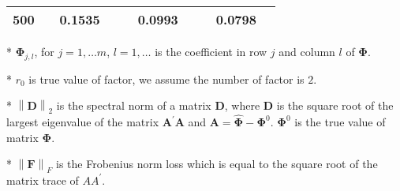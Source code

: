 \documentclass[12pt,a4paper,hyperref]{article}
\begin{document}
\begin{table}[H]
\begin{threeparttable}
\begin{tabular} {*{10}{c}}
500& &0.1535& &  & 0.0993& & &0.0798 & \\
\bottomrule
\end{tabular}
\begin{tablenotes}
\footnotesize
  \item[*] $\boldsymbol{\Phi}_{j,l}$, for $j=1,\ldots m$, $l=1,\ldots$ is the coefficient in row $j$ and column $l$ of $\boldsymbol{\Phi}$.
\item[*] $r_{0}$ is true value of factor, we assume the number of factor is $2$.
 \item[*] $\left\| \boldsymbol{D} \right\|_{2}$ is the spectral norm of a matrix $\boldsymbol{D}$, where $\boldsymbol{D}$ is the square root of the largest eigenvalue of the matrix $\boldsymbol{A}^{'}\boldsymbol{A}$ and $\boldsymbol{A}=\hat{\boldsymbol{\Phi}}- \boldsymbol{\Phi}^{0}$. $\boldsymbol{\Phi}^{0}$ is the true value of matrix $\boldsymbol{\Phi}$.
 \item[*] $\left\| \boldsymbol{F} \right\|_{F} $ is the Frobenius norm loss which is equal to the square root of the matrix trace of $AA^{'}$.
    \end{tablenotes}
\end{threeparttable}
\end{table}
\end{document}
